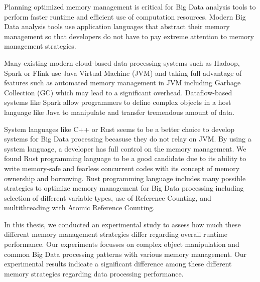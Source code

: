 

Planning optimized memory management is critical for Big Data analysis tools to
perform faster runtime and efficient use of computation resources.
Modern Big Data analysis tools use application languages that abstract their
memory management so that developers do not have to pay extreme attention
to memory management strategies.

Many existing modern cloud-based data processing systems such as Hadoop, Spark or Flink use
Java Virtual Machine (JVM) and taking full advantage of features such as automated memory management in JVM
including Garbage Collection (GC) which may lead to a significant overhead.
Dataflow-based systems like Spark allow programmers to define complex objects in a
host language like Java to manipulate and transfer tremendous amount of data.


System languages like C++ or Rust seems to be a better choice to
develop systems for Big Data processing becasuse they do not relay on JVM.
By using a system language, a developer has full control on the memory management.
We found Rust programming language to be a good candidate due to its ability to write memory-safe and
fearless concurrent codes with its concept of memory ownership and borrowing.
Rust programming language includes many possible strategies to optimize memory management for Big Data processing including
selection of different variable types, use of Reference Counting, and multithreading with Atomic Reference Counting.

In this thesis, we conducted an experimental study to assess how much these different memory management
strategies differ regarding overall runtime performance.
Our experiments focusses on complex object manipulation and common Big Data processing patterns
with various memory management. Our experimental results indicate a significant
difference among these different memory strategies regarding data processing performance.
